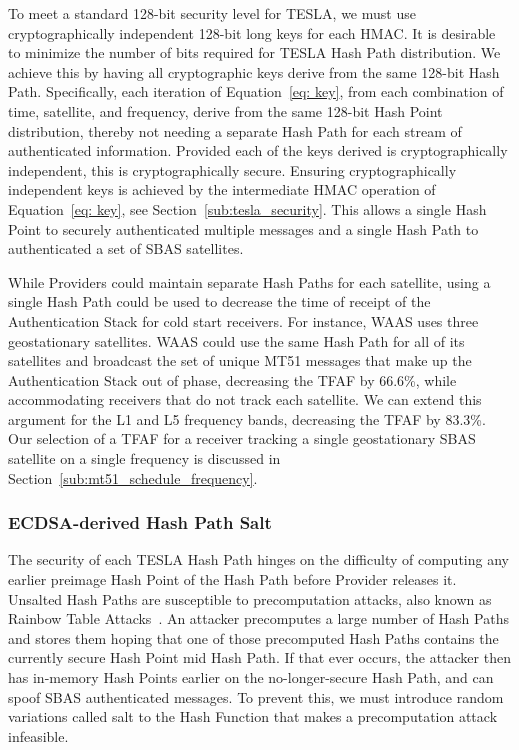 \documentclass[APA,STIX1COL]{IONjournal/ION-APA Template}
\begin{document}
		To meet a standard 128-bit security level for TESLA, we must use cryptographically independent 128-bit long keys for each HMAC.
		It is desirable to minimize the number of bits required for TESLA Hash Path distribution.
		We achieve this by having all cryptographic keys derive from the same 128-bit Hash Path.
		Specifically, each iteration of Equation~\eqref{eq: key}, from each combination of time, satellite, and frequency, derive from the same 128-bit Hash Point distribution, thereby not needing a separate Hash Path for each stream of authenticated information.
		Provided each of the keys derived is cryptographically independent, this is cryptographically secure.
		Ensuring cryptographically independent keys is achieved by the intermediate HMAC operation of Equation~\eqref{eq: key}, see Section~\ref{sub:tesla_security}.
		This allows a single Hash Point to securely authenticated multiple messages and a single Hash Path to authenticated a set of SBAS satellites.

		While Providers could maintain separate Hash Paths for each satellite, using a single Hash Path could be used to decrease the time of receipt of the Authentication Stack for cold start receivers.
		For instance, WAAS uses three geostationary satellites.
		WAAS could use the same Hash Path for all of its satellites and broadcast the set of unique MT51 messages that make up the Authentication Stack out of phase, decreasing the TFAF by 66.6\%, while accommodating receivers that do not track each satellite.
		We can extend this argument for the L1 and L5 frequency bands, decreasing the TFAF by 83.3\%.
		Our selection of a TFAF for a receiver tracking a single geostationary SBAS satellite on a single frequency is discussed in Section~\ref{sub:mt51_schedule_frequency}.

		\subsubsection{ECDSA-derived Hash Path Salt} \label{subsub:ecdsa_salt}

			The security of each TESLA Hash Path hinges on the difficulty of computing any earlier preimage Hash Point of the Hash Path before Provider releases it.
			Unsalted Hash Paths are susceptible to precomputation attacks, also known as Rainbow Table Attacks~\cite{boneh2017graduate}.
			An attacker precomputes a large number of Hash Paths and stores them hoping that one of those precomputed Hash Paths contains the currently secure Hash Point mid Hash Path.
			If that ever occurs, the attacker then has in-memory Hash Points earlier on the no-longer-secure Hash Path, and can spoof SBAS authenticated messages.
			To prevent this, we must introduce random variations called salt to the Hash Function that makes a precomputation attack infeasible.
\end{document}
